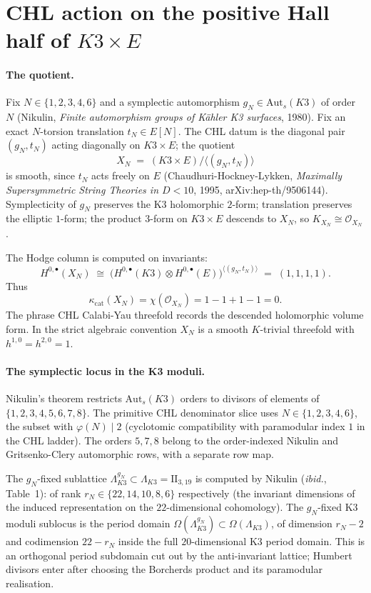 \documentclass{article}
\providecommand{\Auts}{\mathrm{Aut}_s}
\providecommand{\kcat}{\kappa_{\mathrm{cat}}}
\begin{document}
\section*{CHL action on the positive Hall half of $K3 \times E$}

\paragraph{The quotient.}
Fix $N \in \{1,2,3,4,6\}$ and a symplectic automorphism
$g_N \in \Auts(K3)$ of order $N$ (Nikulin, \emph{Finite automorphism
groups of K\"ahler K3 surfaces}, 1980). Fix an exact $N$-torsion
translation $t_N \in E[N]$. The CHL datum is the diagonal pair
$(g_N, t_N)$ acting diagonally on $K3 \times E$; the quotient
\[
  X_N \;=\; (K3 \times E)\big/\langle (g_N, t_N)\rangle
\]
is smooth, since $t_N$ acts freely on $E$ (Chaudhuri-Hockney-Lykken,
\emph{Maximally Supersymmetric String Theories in $D < 10$}, 1995,
arXiv:hep-th/9506144). Symplecticity of $g_N$ preserves the K3
holomorphic $2$-form; translation preserves the elliptic
$1$-form; the product $3$-form on $K3 \times E$ descends to $X_N$,
so $K_{X_N}\cong\mathcal{O}_{X_N}$.

The Hodge column is computed on invariants:
\[
  H^{0,\bullet}(X_N)
  \;\cong\;
  \bigl(H^{0,\bullet}(K3)\otimes H^{0,\bullet}(E)\bigr)^{
    \langle(g_N,t_N)\rangle}
  \;=\; (1,1,1,1).
\]
Thus
\[
  \kcat(X_N)=\chi(\mathcal{O}_{X_N})=1-1+1-1=0.
\]
The phrase CHL Calabi-Yau threefold records the descended holomorphic
volume form. In the strict algebraic convention $X_N$ is a smooth
$K$-trivial threefold with $h^{1,0}=h^{2,0}=1$.

\paragraph{The symplectic locus in the K3 moduli.}
Nikulin's theorem restricts $\Auts(K3)$ orders to divisors of elements
of $\{1,2,3,4,5,6,7,8\}$. The primitive CHL denominator slice uses
$N \in \{1,2,3,4,6\}$, the subset with
$\varphi(N) \mid 2$ (cyclotomic compatibility with paramodular
index $1$ in the CHL ladder). The orders $5,7,8$ belong to the
order-indexed Nikulin and Gritsenko-Clery automorphic rows, with a
separate row map.

The $g_N$-fixed sublattice
$\Lambda_{K3}^{g_N} \subset \Lambda_{K3} = \mathrm{II}_{3,19}$ is
computed by Nikulin (\emph{ibid.}, Table~1): of rank
$r_N \in \{22, 14, 10, 8, 6\}$ respectively (the invariant
dimensions of the induced representation on the $22$-dimensional
cohomology). The $g_N$-fixed K3 moduli sublocus is the
period domain
$\Omega(\Lambda_{K3}^{g_N}) \subset \Omega(\Lambda_{K3})$,
of dimension $r_N-2$ and codimension $22-r_N$ inside the full
$20$-dimensional K3 period domain. This is an orthogonal period
subdomain cut out by the anti-invariant lattice; Humbert divisors
enter after choosing the Borcherds product and its paramodular
realisation.
\end{document}
